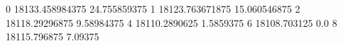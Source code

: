 0 18133.458984375 24.755859375
1 18123.763671875 15.060546875
2 18118.29296875 9.58984375
4 18110.2890625 1.5859375
6 18108.703125 0.0
8 18115.796875 7.09375
